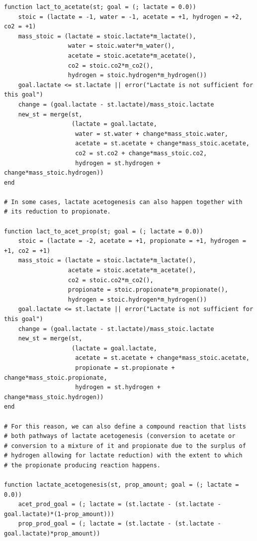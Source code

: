 \documentclass[11pt]{article}
\begin{document}
\begin{verbatim}
function lact_to_acetate(st; goal = (; lactate = 0.0))
    stoic = (lactate = -1, water = -1, acetate = +1, hydrogen = +2, co2 = +1)
    mass_stoic = (lactate = stoic.lactate*m_lactate(),
                  water = stoic.water*m_water(),
                  acetate = stoic.acetate*m_acetate(),
                  co2 = stoic.co2*m_co2(),
                  hydrogen = stoic.hydrogen*m_hydrogen())
    goal.lactate <= st.lactate || error("Lactate is not sufficient for this goal")
    change = (goal.lactate - st.lactate)/mass_stoic.lactate
    new_st = merge(st,
                   (lactate = goal.lactate,
                    water = st.water + change*mass_stoic.water,
                    acetate = st.acetate + change*mass_stoic.acetate,
                    co2 = st.co2 + change*mass_stoic.co2,
                    hydrogen = st.hydrogen + change*mass_stoic.hydrogen))
end

# In some cases, lactate acetogenesis can also happen together with
# its reduction to propionate.

function lact_to_acet_prop(st; goal = (; lactate = 0.0))
    stoic = (lactate = -2, acetate = +1, propionate = +1, hydrogen = +1, co2 = +1)
    mass_stoic = (lactate = stoic.lactate*m_lactate(),
                  acetate = stoic.acetate*m_acetate(),
                  co2 = stoic.co2*m_co2(),
                  propionate = stoic.propionate*m_propionate(),
                  hydrogen = stoic.hydrogen*m_hydrogen())
    goal.lactate <= st.lactate || error("Lactate is not sufficient for this goal")
    change = (goal.lactate - st.lactate)/mass_stoic.lactate
    new_st = merge(st,
                   (lactate = goal.lactate,
                    acetate = st.acetate + change*mass_stoic.acetate,
                    propionate = st.propionate + change*mass_stoic.propionate,
                    hydrogen = st.hydrogen + change*mass_stoic.hydrogen))
end

# For this reason, we can also define a compound reaction that lists
# both pathways of lactate acetogenesis (conversion to acetate or
# conversion to a mixture of it and propionate due to the surplus of
# hydrogen allowing for lactate reduction) with the extent to which
# the propionate producing reaction happens.

function lactate_acetogenesis(st, prop_amount; goal = (; lactate = 0.0))
    acet_prod_goal = (; lactate = (st.lactate - (st.lactate - goal.lactate)*(1-prop_amount)))
    prop_prod_goal = (; lactate = (st.lactate - (st.lactate - goal.lactate)*prop_amount))


\end{verbatim}
\end{document}
